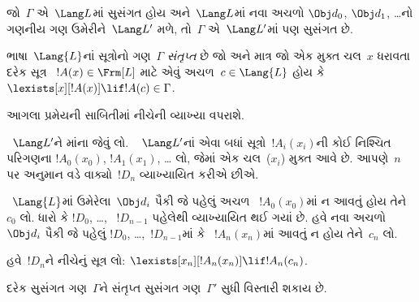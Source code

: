 \begin{prop}
જો~$\Gamma$ એ~$\Lang L$માં સુસંગત હોય અને~$\Lang L$માં નવા
અચળો $\Obj d_0$, $\Obj d_1$, \dots{}નો ગણનીય ગણ
ઉમેરીને~$\Lang L'$ મળે, તો~$\Gamma$ એ~$\Lang L'$માં પણ સુસંગત છે.
\end{prop}

\begin{defn}[સંતૃપ્ત ગણ]
ભાષા~$\Lang {L}$નાં સૂત્રોનો ગણ~$\Gamma$ \emph{સંતૃપ્ત} છે જો
અને માત્ર જો એક મુક્ત ચલ~$x$ ધરાવતા દરેક સૂત્ર
~$!A(x) \in \Frm[L]$ માટે એવું અચળ~$c \in \Lang{L}$
હોય કે
$\lexists[x][!A(x)] \lif !A(c) \in \Gamma$.
\end{defn}

આગલા પ્રમેયની સાબિતીમાં નીચેની વ્યાખ્યા વપરાશે.

\begin{defn}
~$\Lang L'$ને માંના જેવું લો. ~ $\Lang L'$નાં એવા
બધાં સૂત્રો~$!A_i(x_i)$ની કોઈ નિશ્ચિત પરિગણના
$!A_0(x_0)$, $!A_1(x_1)$, \dots{} લો, જેમાં એક ચલ~($x_i$) મુક્ત આવે
છે. આપણે~$n$ પર અનુમાન વડે વાક્યો~$!D_n$ વ્યાખ્યાયિત કરીએ છીએ.

~$\Lang{L}$માં ઉમેરેલા~$\Obj d_i$ પૈકી જે પહેલું અચળ
~$!A_0(x_0)$માં ન આવતું હોય તેને~$c_0$ લો. ધારો કે $!D_0$, \dots,
~$!D_{n-1}$ પહેલેથી વ્યાખ્યાયિત થઈ ગયાં છે. હવે નવા અચળો
~$\Obj d_i$ પૈકી જે પહેલું $!D_0$, \dots,~$!D_{n-1}$માં કે
~$!A_n(x_n)$માં આવતું ન હોય તેને~$c_n$ લો.

હવે~$!D_{n}$ને નીચેનું સૂત્ર લો:
$\lexists[x_{n}][!A_{n}(x_{n})] \lif
  !A_{n}(c_{n})$.
\end{defn}

\begin{lem}
દરેક સુસંગત ગણ~$\Gamma$ને સંતૃપ્ત સુસંગત ગણ~$\Gamma'$ સુધી વિસ્તારી
શકાય છે.
\end{lem}

